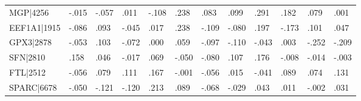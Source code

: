 \begin{table}[h]
\begin{tabular}{llllllllllll}
MGP|4256                        & -.015                            & -.057                            & .011                             & -.108                            & .238                             & .083                             & .099                             & .291                             & .182                             & .079                              & .001                              \\
EEF1A1|1915                     & -.086                            & .093                             & -.045                            & .017                             & .238                             & -.109                            & -.080                            & .197                             & -.173                            & .101                              & .047                              \\
GPX3|2878                       & -.053                            & .103                             & -.072                            & .000                             & .059                             & -.097                            & -.110                            & -.043                            & .003                             & -.252                             & -.209                             \\
SFN|2810                        & .158                             & .046                             & -.017                            & .069                             & -.050                            & -.080                            & .107                             & .176                             & -.008                            & -.014                             & -.003                             \\
FTL|2512                        & -.056                            & .079                             & .111                             & .167                             & -.001                            & -.056                            & .015                             & -.041                            & .089                             & .074                              & .131                              \\
SPARC|6678                      & -.050                            & -.121                            & -.120                            & .213                             & .089                             & -.068                            & -.029                            & .043                             & .011                             & -.002                             & .031                              \\

\end{tabular}
\end{table}
